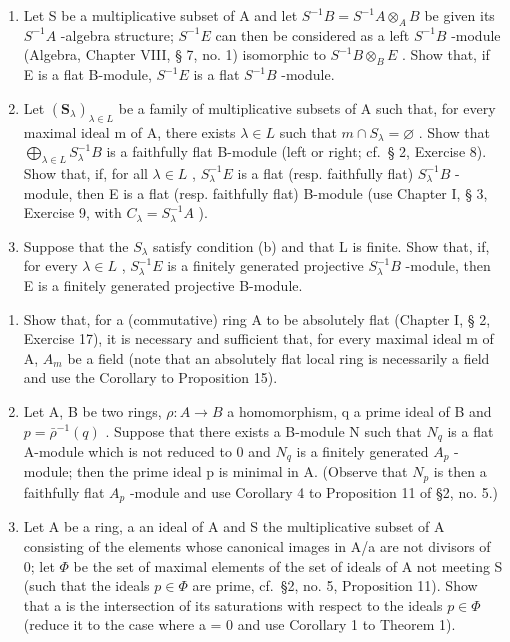 \begin{enumerate}
\def\labelenumi{(\alph{enumi})}
\item
  Let S be a multiplicative subset of A and let \(S^{-1}B = S^{-1}A \otimes_{A} B\) be given its \(S^{-1}A\) -algebra structure; \(S^{-1}E\) can then be considered as a left \(S^{-1}B\) -module (Algebra, Chapter VIII, § 7, no. 1) isomorphic to \(S^{-1}B \otimes_{B} E\) . Show that, if E is a flat B-module, \(S^{-1}E\) is a flat \(S^{-1}B\) -module.
\item
  Let \((\mathbf{S}_{\lambda})_{\lambda \in L}\) be a family of multiplicative subsets of A such that, for every maximal ideal m of A, there exists \(\lambda \in L\) such that \(m \cap S_{\lambda} = \varnothing\) . Show that \(\bigoplus_{\lambda \in L} S_{\lambda}^{-1} B\) is a faithfully flat B-module (left or right; cf.~§ 2, Exercise 8). Show that, if, for all \(\lambda \in L\) , \(S_{\lambda}^{-1} E\) is a flat (resp. faithfully flat) \(S_{\lambda}^{-1} B\) -module, then E is a flat (resp. faithfully flat) B-module (use Chapter I, § 3, Exercise 9, with \(C_{\lambda} = S_{\lambda}^{-1} A\) ).
\item
  Suppose that the \(S_{\lambda}\) satisfy condition (b) and that L is finite. Show that, if, for every \(\lambda \in L\) , \(S_{\lambda}^{-1}E\) is a finitely generated projective \(S_{\lambda}^{-1}B\) -module, then E is a finitely generated projective B-module.
\end{enumerate}

\begin{enumerate}
\def\labelenumi{\arabic{enumi}.}
\setcounter{enumi}{8}
\item
  Show that, for a (commutative) ring A to be absolutely flat (Chapter I, § 2, Exercise 17), it is necessary and sufficient that, for every maximal ideal m of A, \(A_{m}\) be a field (note that an absolutely flat local ring is necessarily a field and use the Corollary to Proposition 15).
\item
  Let A, B be two rings, \(\rho: A \rightarrow B\) a homomorphism, q a prime ideal of B and \(p = \bar{\rho}^{-1}(q)\) . Suppose that there exists a B-module N such that \(N_{q}\) is a flat A-module which is not reduced to 0 and \(N_{q}\) is a finitely generated \(A_{p}\) -module; then the prime ideal p is minimal in A. (Observe that \(N_{p}\) is then a faithfully flat \(A_{p}\) -module and use Corollary 4 to Proposition 11 of §2, no. 5.)
\item
  Let A be a ring, a an ideal of A and S the multiplicative subset of A consisting of the elements whose canonical images in A/a are not divisors of 0; let \(\Phi\) be the set of maximal elements of the set of ideals of A not meeting S (such that the ideals \(p \in \Phi\) are prime, cf.~§2, no. 5, Proposition 11). Show that a is the intersection of its saturations with respect to the ideals \(p \in \Phi\) (reduce it to the case where a = 0 and use Corollary 1 to Theorem 1).
\end{enumerate}

